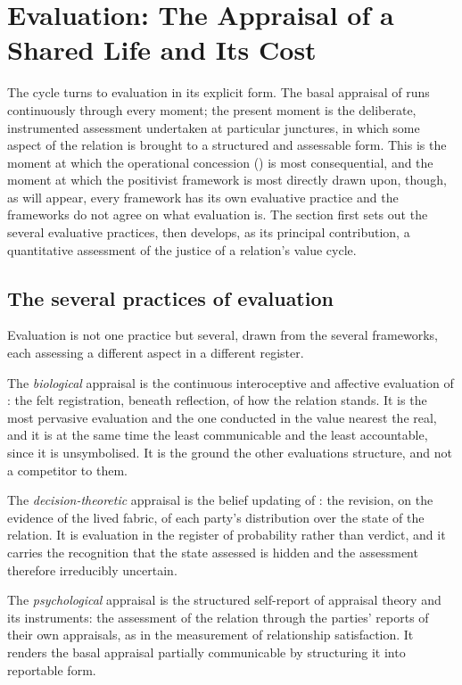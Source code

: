 \section{Evaluation: The Appraisal of a Shared Life and Its Cost}
\label{p11:sec:evaluation}

\noindent
The cycle turns to evaluation in its explicit form. The basal appraisal of  runs continuously through every moment; the present moment is the deliberate, instrumented assessment undertaken at particular junctures, in which some aspect of the relation is brought to a structured and assessable form. This is the moment at which the operational concession () is most consequential, and the moment at which the positivist framework is most directly drawn upon, though, as will appear, every framework has its own evaluative practice and the frameworks do not agree on what evaluation is. The section first sets out the several evaluative practices, then develops, as its principal contribution, a quantitative assessment of the justice of a relation's value cycle.

\subsection{The several practices of evaluation}
\label{p11:sec:ev-layers}

Evaluation is not one practice but several, drawn from the several frameworks, each assessing a different aspect in a different register.

The \emph{biological} appraisal is the continuous interoceptive and affective evaluation of : the felt registration, beneath reflection, of how the relation stands. It is the most pervasive evaluation and the one conducted in the value nearest the real, and it is at the same time the least communicable and the least accountable, since it is unsymbolised. It is the ground the other evaluations structure, and not a competitor to them.

The \emph{decision-theoretic} appraisal is the belief updating of : the revision, on the evidence of the lived fabric, of each party's distribution over the state of the relation. It is evaluation in the register of probability rather than verdict, and it carries the recognition that the state assessed is hidden and the assessment therefore irreducibly uncertain.

The \emph{psychological} appraisal is the structured self-report of appraisal theory and its instruments: the assessment of the relation through the parties' reports of their own appraisals, as in the measurement of relationship satisfaction. It renders the basal appraisal partially communicable by structuring it into reportable form.

